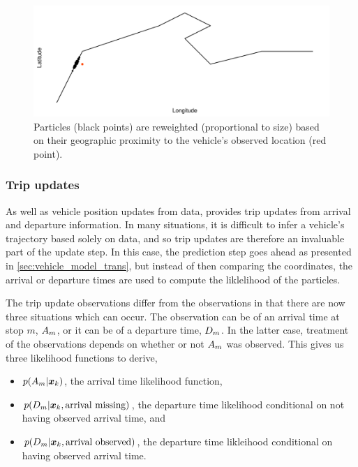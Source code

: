 \begin{knitrout}\small
{}\color{fgcolor}\begin{figure}

{\centering \includegraphics[width=\maxwidth]{figure/pf_wts-1} 

}

\caption[Particles are reweighted based on their geographic proximity to the vehicle's observed location]{Particles (black points) are reweighted (proportional to size) based on their geographic proximity to the vehicle's observed location (red point).}\label{fig:pf_wts}
\end{figure}


\end{knitrout}


\subsubsection{Trip updates}
\label{sec:lhood_trip}

As well as vehicle position updates from \GPS{} data, \GTFS{} provides trip updates from arrival and departure information. In many situations, it is difficult to infer a vehicle's trajectory based solely on \GPS{} data, and so trip updates are therefore an invaluable part of the update step. In this case, the \pf{} prediction step goes ahead as presented in \cref{sec:vehicle_model_trans}, but instead of then comparing the coordinates, the arrival or departure times are used to compute the liklelihood of the particles.


The trip update observations differ from the \GPS{} observations in that there are now three situations which can occur. The observation can be of an arrival time at stop $m$, $A_m$, or it can be of a departure time, $D_m$. In the latter case, treatment of the observations depends on whether or not $A_m$ was observed. This gives us three likelihood functions to derive,
\begin{itemize}
\item $p(A_m | \boldsymbol x_k)$, the arrival time likelihood function,
\item $p(D_m | \boldsymbol x_k, \text{arrival missing})$, the departure time likelihood conditional
    on not having observed arrival time, and
\item $p(D_m | \boldsymbol x_k, \text{arrival observed})$, the departure time likleihood conditional
    on having observed arrival time.
\end{itemize}



